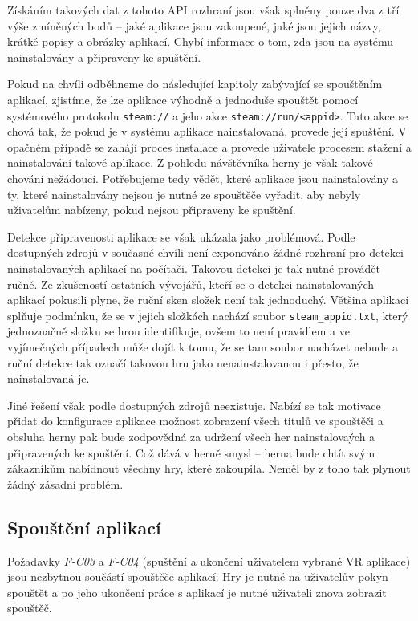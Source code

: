 Získáním takových dat z tohoto API rozhraní jsou však splněny pouze dva
z tří výše zmíněných bodů -- jaké aplikace jsou zakoupené, jaké jsou
jejich názvy, krátké popisy a obrázky aplikací. Chybí informace o tom,
zda jsou na systému nainstalovány a připraveny ke spuštění.

Pokud na chvíli odběhneme do následující kapitoly zabývající se
spouštěním aplikací, zjistíme, že lze aplikace výhodně a jednoduše
spouštět pomocí systémového protokolu \texttt{steam://} a jeho akce
\texttt{steam://run/\textless{}appid\textgreater{}}. Tato akce se chová
tak, že pokud je v systému aplikace nainstalovaná, provede její
spuštění. V opačném případě se zahájí proces instalace a provede
uživatele procesem stažení a nainstalování takové aplikace. Z pohledu
návštěvníka herny je však takové chování nežádoucí. Potřebujeme tedy
vědět, které aplikace jsou nainstalovány a ty, které nainstalovány
nejsou je nutné ze spouštěče vyřadit, aby nebyly uživatelům nabízeny,
pokud nejsou připraveny ke spuštění.

Detekce připravenosti aplikace se však ukázala jako
problémová. Podle dostupných zdrojů v současné chvíli není exponováno
žádné rozhraní pro detekci nainstalovaných aplikací na počítači. 
Takovou detekci je tak nutné provádět ručně. Ze zkušeností
ostatních vývojářů, kteří se o detekci nainstalovaných aplikací pokusili
plyne, že ruční sken složek není tak jednoduchý. Většina aplikací splňuje
podmínku, že se v jejich složkách nachází soubor
\texttt{steam\_appid.txt}, který jednoznačně složku se hrou
identifikuje, ovšem to není pravidlem a ve vyjímečných případech může
dojít k tomu, že se tam soubor nacházet nebude a ruční detekce tak 
označí takovou hru jako nenainstalovanou i přesto, že nainstalovaná je.

Jiné řešení však podle dostupných zdrojů neexistuje. Nabízí se tak
motivace přidat do konfigurace aplikace možnost zobrazení všech titulů
ve spouštěči a obsluha herny pak bude zodpovědná za udržení všech her
nainstalovaých a připravených ke spuštění. Což dává v herně smysl --
herna bude chtít svým zákazníkům nabídnout všechny hry, které
zakoupila. Neměl by z toho tak plynout žádný zásadní problém.

\subsection{Spouštění
aplikací}\label{spouux161tux11bnuxed-aplikacuxed}

Požadavky \emph{F-C03} a \emph{F-C04} (spuštění a ukončení uživatelem
vybrané VR aplikace) jsou nezbytnou součástí spouštěče
aplikací. Hry je nutné na uživatelův pokyn spouštět a po jeho ukončení
práce s aplikací je nutné uživateli znova zobrazit spouštěč.

